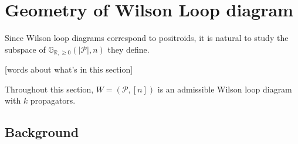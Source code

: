 \documentclass[11pt]{article}
\newcommand{\R}{\mathbb{R}}
\newcommand{\Gr}{\mathbb{G}_{\R, \geq 0}}
\newcommand{\cP}{\mathcal{P}}
\newtheorem{thm}{Theorem}[section]
\theoremstyle{remark}
\theoremstyle{definition}
\newtheorem{dfn}[thm]{Definition}
\begin{document}

\section{Geometry of Wilson Loop diagram}\label{sec GN algorithm}


Since Wilson loop diagrams correspond to positroids, it is natural to study the subspace of $\Gr(|\cP|, n)$ they define. 

[words about what's in this section]

Throughout this section, $W = (\cP,[n])$ is an admissible Wilson loop diagram with $k$ propagators.

\subsection{Background}\label{sec:positroid background}
\end{document}
